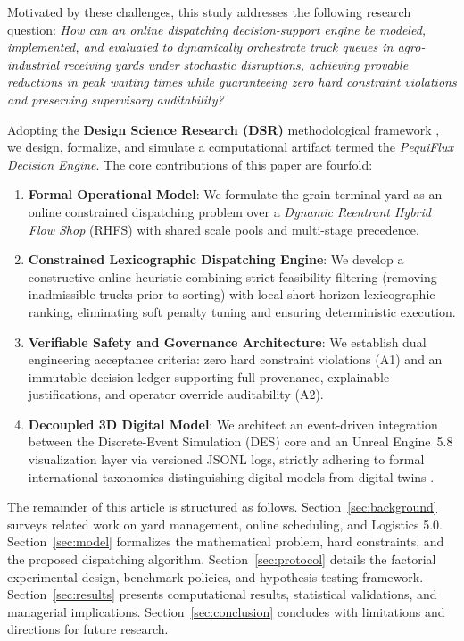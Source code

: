 \documentclass[12pt,a4paper]{article}
\begin{document}
Motivated by these challenges, this study addresses the following research question: \emph{How can an online dispatching decision-support engine be modeled, implemented, and evaluated to dynamically orchestrate truck queues in agro-industrial receiving yards under stochastic disruptions, achieving provable reductions in peak waiting times while guaranteeing zero hard constraint violations and preserving supervisory auditability?}

Adopting the \textbf{Design Science Research (DSR)} methodological framework \parencite{hevnerDesignScienceInformation2004a, peffersDesignScienceResearch2007aa}, we design, formalize, and simulate a computational artifact termed the \emph{PequiFlux Decision Engine}. The core contributions of this paper are fourfold:
\begin{enumerate}[leftmargin=1.2cm,itemsep=0pt,topsep=2pt]
  \item \textbf{Formal Operational Model}: We formulate the grain terminal yard as an online constrained dispatching problem over a \emph{Dynamic Reentrant Hybrid Flow Shop} (RHFS) with shared scale pools and multi-stage precedence.
  \item \textbf{Constrained Lexicographic Dispatching Engine}: We develop a constructive online heuristic combining strict feasibility filtering (removing inadmissible trucks prior to sorting) with local short-horizon lexicographic ranking, eliminating soft penalty tuning and ensuring deterministic execution.
  \item \textbf{Verifiable Safety and Governance Architecture}: We establish dual engineering acceptance criteria: zero hard constraint violations (A1) and an immutable decision ledger supporting full provenance, explainable justifications, and operator override auditability (A2).
  \item \textbf{Decoupled 3D Digital Model}: We architect an event-driven integration between the Discrete-Event Simulation (DES) core and an Unreal Engine~5.8 visualization layer via versioned JSONL logs, strictly adhering to formal international taxonomies distinguishing digital models from digital twins \parencite{kritzingerDigitalTwinManufacturing2018, nistDigitalTwinsEssentialElements2026}.
\end{enumerate}

The remainder of this article is structured as follows. Section~\ref{sec:background} surveys related work on yard management, online scheduling, and Logistics 5.0. Section~\ref{sec:model} formalizes the mathematical problem, hard constraints, and the proposed dispatching algorithm. Section~\ref{sec:protocol} details the factorial experimental design, benchmark policies, and hypothesis testing framework. Section~\ref{sec:results} presents computational results, statistical validations, and managerial implications. Section~\ref{sec:conclusion} concludes with limitations and directions for future research.
\end{document}
